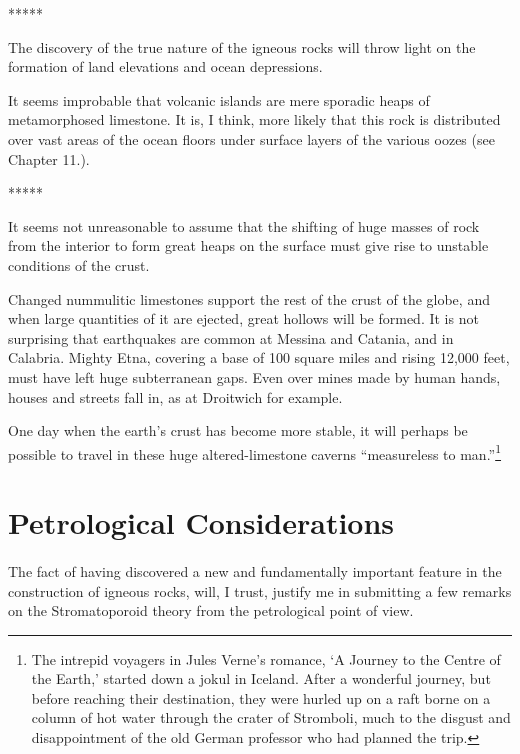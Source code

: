\documentclass[a4paper, 12pt, oneside]{article}
\begin{document}
\centerline{*\hspace{15mm}*\hspace{15mm}*\hspace{15mm}*\hspace{15mm}*}
\bigskip

The discovery of the true nature of the igneous rocks will throw light on the formation of land elevations and ocean depressions.

It seems improbable that volcanic islands are mere sporadic heaps of metamorphosed limestone. It is, I think, more likely that this rock is distributed over vast areas of the ocean floors under surface layers of the various oozes (see Chapter 11.).

\centerline{*\hspace{15mm}*\hspace{15mm}*\hspace{15mm}*\hspace{15mm}*}
\bigskip

It seems not unreasonable to assume that the shifting of huge masses of rock from the interior to form great heaps on the surface must give rise to unstable conditions of the crust.

Changed nummulitic limestones support the rest of the crust of the globe, and when large quantities of it are ejected, great hollows will be formed. It is not surprising that earthquakes are common at Messina and Catania, and in Calabria. Mighty Etna, covering a base of 100 square miles and rising 12,000 feet, must have left huge subterranean gaps. Even over mines made by human hands, houses and streets fall in, as at Droitwich for example.

One day when the earth's crust has become more stable, it will perhaps be possible to travel in these huge altered-limestone caverns ``measureless to man.''\footnote{The intrepid voyagers in Jules Verne's romance, `A Journey to the Centre of the Earth,' started down a jokul in Iceland. After a wonderful journey, but before reaching their destination, they were hurled up on a raft borne on a column of hot water through the crater of Stromboli, much to the disgust and disappointment of the old German professor who had planned the trip.}
\clearpage
\section{Petrological Considerations}
\paragraph{}
The fact of having discovered a new and fundamentally important feature in the construction of igneous rocks, will, I trust, justify me in submitting a few remarks on the Stromatoporoid theory from the petrological point of view.
\end{document}

